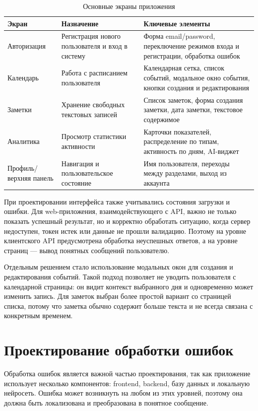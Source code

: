 \documentclass[14pt,a4paper]{extreport}
\begin{document}
\begin{longtable}{|p{}|p{}|p{}|}
\caption{Основные экраны приложения}\\
\hline
\textbf{Экран} & \textbf{Назначение} & \textbf{Ключевые элементы}\\
\hline
Авторизация & Регистрация нового пользователя и вход в систему & Форма email/password, переключение режимов входа и регистрации, обработка ошибок\\
\hline
Календарь & Работа с расписанием пользователя & Календарная сетка, список событий, модальное окно события, кнопки создания и редактирования\\
\hline
Заметки & Хранение свободных текстовых записей & Список заметок, форма создания заметки, дата заметки, текстовое содержимое\\
\hline
Аналитика & Просмотр статистики активности & Карточки показателей, распределение по типам, активность по дням, AI-виджет\\
\hline
Профиль/верхняя панель & Навигация и пользовательское состояние & Имя пользователя, переходы между разделами, выход из аккаунта\\
\hline
\end{longtable}

При проектировании интерфейса также учитывались состояния загрузки и ошибки. Для web-приложения, взаимодействующего с API, важно не только показать успешный результат, но и корректно обработать ситуацию, когда сервер недоступен, токен истек или данные не прошли валидацию. Поэтому на уровне клиентского API предусмотрена обработка неуспешных ответов, а на уровне страниц --- вывод понятных сообщений пользователю.

Отдельным решением стало использование модальных окон для создания и редактирования событий. Такой подход позволяет не уводить пользователя с календарной страницы: он видит контекст выбранного дня и одновременно может изменить запись. Для заметок выбран более простой вариант со страницей списка, потому что заметка обычно содержит больше текста и не всегда связана с конкретным временем.

\section{Проектирование обработки ошибок}

Обработка ошибок является важной частью проектирования, так как приложение использует несколько компонентов: frontend, backend, базу данных и локальную нейросеть. Ошибка может возникнуть на любом из этих уровней, поэтому она должна быть локализована и преобразована в понятное сообщение.
\end{document}

